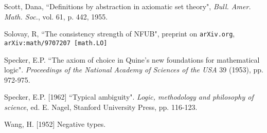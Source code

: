 \documentclass[12pt]{article}
\begin{document}
\begin{thebibliography}{99}
  Scott, Dana, ``Definitions by abstraction in axiomatic set theory",  {\em Bull. Amer. Math.
Soc.}, vol. 61, p. 442, 1955.

  Solovay, R, ``The consistency strength of NFUB",  preprint on {\tt arXiv.org}, {\tt arXiv:math/9707207 [math.LO]}

  Specker, E.P.
``The axiom of choice in Quine's new foundations for mathematical logic". 
{\em Proceedings of the National Academy of Sciences of the USA\/} 39 (1953), pp. 972-975.

  Specker, E.P. [1962] 
``Typical ambiguity". 
{\em Logic, methodology and philosophy of science\/}, ed. E. Nagel, Stanford University Press, pp. 116-123.

  Wang, H. [1952] 
Negative types.


\end{thebibliography}
\end{document}
